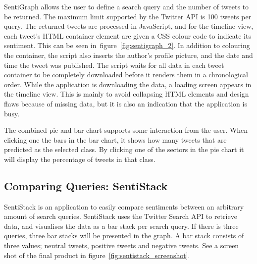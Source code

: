 SentiGraph allows the user to define a search query and the number of tweets to be returned. The maximum limit supported by the Twitter API is 100 tweets per query. The returned tweets are processed in JavaScript, and for the timeline view, each tweet's HTML container element are given a CSS colour code to indicate its sentiment. This can be seen in~figure~\ref{fig:sentigraph_2}. In addition to colouring the container, the script also inserts the author's profile picture, and the date and time the tweet was published. The script waits for all data in each tweet container to be completely downloaded before it renders them in a chronological order. While the application is downloading the data, a loading screen appears in the timeline view. This is mainly to avoid collapsing HTML elements and design flaws because of missing data, but it is also an indication that the application is busy.

The combined pie and bar chart supports some interaction from the user. When clicking one the bars in the bar chart, it shows how many tweets that are predicted as the selected class. By clicking one of the sectors in the pie chart it will display the percentage of tweets in that class.

\subsection{Comparing Queries: SentiStack}

SentiStack is an application to easily compare sentiments between an arbitrary amount of search queries. SentiStack uses the Twitter Search API to retrieve data, and visualises the data as a bar stack per search query. If there is three queries, three bar stacks will be presented in the graph. A bar stack consists of three values; neutral tweets, positive tweets and negative tweets. See a screen shot of the final product in figure~\ref{fig:sentistack_screenshot}.


